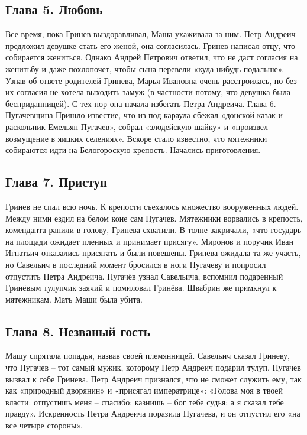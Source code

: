 \documentclass[a4paper,12pt]{article}
\begin{document}
\subsection{Глава 5. Любовь}

Все время, пока Гринев выздоравливал, Маша ухаживала за ним. Петр Андреич предложил девушке стать его женой, она согласилась.
Гринев написал отцу, что собирается жениться. Однако Андрей Петрович ответил, что не даст согласия на женитьбу и даже похлопочет, чтобы сына перевели «куда-нибудь подальше». Узнав об ответе родителей Гринева, Марья Ивановна очень расстроилась, но без их согласия не хотела выходить замуж (в частности потому, что девушка была бесприданницей). С тех пор она начала избегать Петра Андреича.
Глава 6. Пугачевщина
Пришло известие, что из-под караула сбежал «донской казак и раскольник Емельян Пугачев», собрал «злодейскую шайку» и «произвел возмущение в яицких селениях». Вскоре стало известно, что мятежники собираются идти на Белогороскую крепость. Начались приготовления.

\subsection{Глава 7. Приступ}

Гринев не спал всю ночь. К крепости съехалось множество вооруженных людей. Между ними ездил на белом коне сам Пугачев. Мятежники ворвались в крепость, коменданта ранили в голову, Гринева схватили.			
В толпе закричали, «что государь на площади ожидает пленных и принимает присягу». Миронов и поручик Иван Игнатьич отказались присягать и были повешены. Гринева ожидала та же участь, но Савельич в последний момент бросился в ноги Пугачеву и попросил отпустить Петра Андреича. Пугачёв узнал Савельича, вспомнил подаренный Гринёвым тулупчик заячий и помиловал Гринёва. Швабрин же примкнул к мятежникам. Мать Маши была убита.

\subsection{Глава 8. Незваный гость}

Машу спрятала попадья, назвав своей племянницей. Савельич сказал Гриневу, что Пугачев – тот самый мужик, которому Петр Андреич подарил тулуп.
Пугачев вызвал к себе Гринева. Петр Андреич признался, что не сможет служить ему, так как «природный дворянин» и «присягал императрице»: «Голова моя в твоей власти: отпустишь меня – спасибо; казнишь – бог тебе судья; а я сказал тебе правду». Искренность Петра Андреича поразила Пугачева, и он отпустил его «на все четыре стороны».
\end{document}
